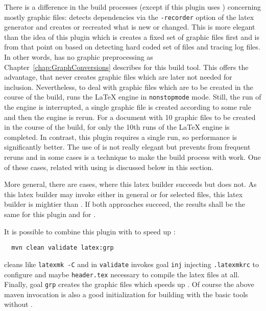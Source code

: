 There is a difference in the build processes (except if this plugin uses ) 
concerning mostly graphic files: 
 detects dependencies via the \texttt{-recorder} option of the latex generator 
and creates or recreated what is new or changed. 
This is more elegant than the idea of this plugin 
which is creates a fixed set of graphic files first 
and is from that point on 
based on detecting hard coded set of files and tracing log files. 
In other words,  has no graphic preprocessing 
as Chapter~\ref{chap:GraphConversions} describes for this build tool. 
This offers the advantage, that  never creates graphic files 
which are later not needed for inclusion. 
Nevertheless, 
to deal with graphic files which are to be created in the course of the build, 
 runs the \LaTeX{} engine in \texttt{nonstopmode} mode. 
Still, the run of the engine is interrupted, 
a single graphic file is created according to some rule 
and then the engine is rerun. 
For a document with 10 graphic files to be created in the course of the build, 
for  only the 10th runs of the \LaTeX{} engine is completed. 
In contrast, this plugin requires a single run, 
so performance is significantly better. 
The use of  is not really elegant 
but prevents  from frequent reruns 
and in some cases is a technique to make the build process with  work. 
One of these cases, 
related with using  is discussed below in this section. 

More general, there are cases, 
where this latex builder succeeds but  does not. 
As this latex builder may invoke  either in general or for selected files, 
this latex builder is mightier than . 
If both approaches succeed, 
the results shall be the same for this plugin and for . 

It is possible to combine this plugin with  to speed up : 
%
\begin{Verbatim}
  mvn clean validate latex:grp
\end{Verbatim}
%
cleans like \texttt{latexmk -C} and in \texttt{validate} 
invokes goal \texttt{inj} injecting \texttt{.latexmkrc} to configure  
and maybe \texttt{header.tex} necessary to compile the latex files at all. 
Finally, goal \texttt{grp} creates the graphic files which speeds up . 
Of course the above maven invocation is also a good initialization 
for building with the basic tools without . 

